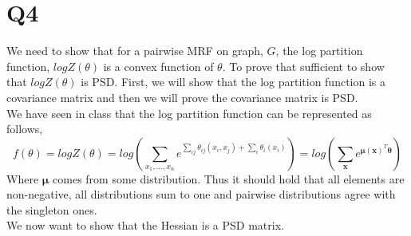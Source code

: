 \documentclass[11pt]{article}
\begin{document}
\part*{Q4}
We need to show that for a pairwise MRF on graph, $G$, the log partition function, $logZ(\theta)$ is a convex function of $\theta$. To prove that sufficient to show that $logZ(\theta)$ is PSD. First, we will show that the log partition function is a covariance matrix and then we will prove the covariance matrix is PSD. \\
We have seen in class that the log partition function can be represented as follows,
\begin{equation*}
	f(\theta)=logZ(\theta) = log\left(\sum_{x_1,...,x_n}e^{\sum_{ij}\theta_{ij}(x_i,x_j)+\sum_i\theta_{i}(x_i)}\right) = log\left(\sum_{\boldsymbol{x}}e^{\boldsymbol{\mu(x)}^T\boldsymbol{\theta}}\right)
\end{equation*}
Where $\boldsymbol{\mu}$ comes from some distribution. Thus it should hold that all elements are non-negative, all distributions sum to one and pairwise distributions agree with the singleton ones. \\
We now want to show that the Hessian is a PSD matrix.\\
\end{document}
